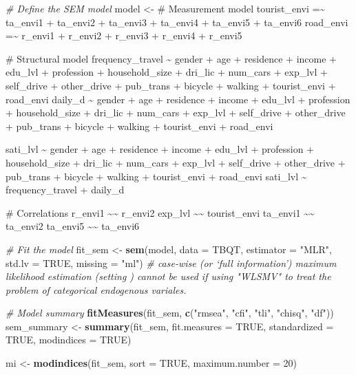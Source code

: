 \documentclass[
11pt, %
oneside, %
english, %
singlespacing, %
]{macthesis} %
\newenvironment{Shaded}{\begin{snugshade}}{\end{snugshade}}
\newcommand{\AttributeTok}[1]{\textcolor[rgb]{0.13,0.29,0.53}{#1}}
\newcommand{\CommentTok}[1]{\textcolor[rgb]{0.56,0.35,0.01}{\textit{#1}}}
\newcommand{\ConstantTok}[1]{\textcolor[rgb]{0.56,0.35,0.01}{#1}}
\newcommand{\DecValTok}[1]{\textcolor[rgb]{0.00,0.00,0.81}{#1}}
\newcommand{\FunctionTok}[1]{\textcolor[rgb]{0.13,0.29,0.53}{\textbf{#1}}}
\newcommand{\NormalTok}[1]{#1}
\newcommand{\OtherTok}[1]{\textcolor[rgb]{0.56,0.35,0.01}{#1}}
\newcommand{\StringTok}[1]{\textcolor[rgb]{0.31,0.60,0.02}{#1}}
\begin{document}
\begin{Shaded}
\begin{Highlighting}[]
\CommentTok{\# Define the SEM model}
\NormalTok{model }\OtherTok{\textless{}{-}} \StringTok{\textquotesingle{}}
\StringTok{\# Measurement model}
\StringTok{tourist\_envi =\textasciitilde{} ta\_envi1 + ta\_envi2 + ta\_envi3 + ta\_envi4 + ta\_envi5 + ta\_envi6}
\StringTok{road\_envi =\textasciitilde{} r\_envi1 + r\_envi2 + r\_envi3 + r\_envi4 + r\_envi5}

\StringTok{\# Structural model}
\StringTok{frequency\_travel \textasciitilde{} gender + age + residence + income + edu\_lvl + profession + household\_size + dri\_lic + num\_cars + exp\_lvl + self\_drive + other\_drive + pub\_trans + bicycle + walking + tourist\_envi + road\_envi}
\StringTok{daily\_d \textasciitilde{} gender + age + residence + income + edu\_lvl + profession + household\_size + dri\_lic + num\_cars + exp\_lvl + self\_drive + other\_drive + pub\_trans + bicycle + walking + tourist\_envi + road\_envi}

\StringTok{sati\_lvl \textasciitilde{} gender + age + residence + income + edu\_lvl + profession + household\_size + dri\_lic + num\_cars + exp\_lvl + self\_drive + other\_drive + pub\_trans + bicycle + walking + tourist\_envi + road\_envi}
\StringTok{sati\_lvl \textasciitilde{} frequency\_travel + daily\_d}

\StringTok{\# Correlations}
\StringTok{r\_envi1 \textasciitilde{}\textasciitilde{} r\_envi2}
\StringTok{exp\_lvl \textasciitilde{}\textasciitilde{} tourist\_envi}
\StringTok{ta\_envi1 \textasciitilde{}\textasciitilde{} ta\_envi2}
\StringTok{ta\_envi5 \textasciitilde{}\textasciitilde{} ta\_envi6}
\StringTok{\textquotesingle{}}

\CommentTok{\# Fit the model}
\NormalTok{fit\_sem }\OtherTok{\textless{}{-}} \FunctionTok{sem}\NormalTok{(model, }\AttributeTok{data =}\NormalTok{ TBQT, }\AttributeTok{estimator =} \StringTok{"MLR"}\NormalTok{, }\AttributeTok{std.lv =} \ConstantTok{TRUE}\NormalTok{, }\AttributeTok{missing =} \StringTok{"ml"}\NormalTok{)}
\CommentTok{\# case{-}wise (or ‘full information’) maximum likelihood estimation (setting \textasciigrave{}\textasciigrave{}) cannot be used if using "WLSMV" to treat the problem of categorical endogenous variales.}

\CommentTok{\# Model summary}
\FunctionTok{fitMeasures}\NormalTok{(fit\_sem, }\FunctionTok{c}\NormalTok{(}\StringTok{"rmsea"}\NormalTok{, }\StringTok{"cfi"}\NormalTok{, }\StringTok{"tli"}\NormalTok{, }\StringTok{"chisq"}\NormalTok{, }\StringTok{"df"}\NormalTok{))}
\NormalTok{sem\_summary }\OtherTok{\textless{}{-}} \FunctionTok{summary}\NormalTok{(fit\_sem, }\AttributeTok{fit.measures =} \ConstantTok{TRUE}\NormalTok{, }\AttributeTok{standardized =} \ConstantTok{TRUE}\NormalTok{, }\AttributeTok{modindices =} \ConstantTok{TRUE}\NormalTok{)}

\NormalTok{mi }\OtherTok{\textless{}{-}} \FunctionTok{modindices}\NormalTok{(fit\_sem, }\AttributeTok{sort =} \ConstantTok{TRUE}\NormalTok{, }\AttributeTok{maximum.number =} \DecValTok{20}\NormalTok{)}
\end{Highlighting}
\end{Shaded}
\end{document}
